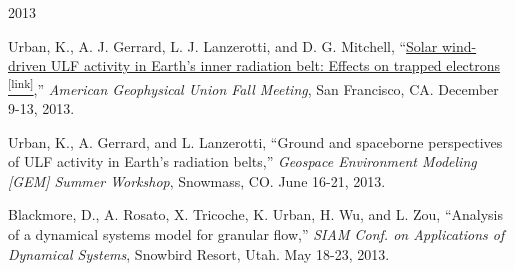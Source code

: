 \begin{center} \Large{2013} \end{center}
\normalsize
\begin{itemize*}
  \item
    Urban, K., A. J. Gerrard, L. J. Lanzerotti, and D. G. Mitchell,
    ``\href{http://adsabs.harvard.edu/abs/2013AGUFMSM33A2129U}{Solar
    wind-driven ULF activity in Earth’s inner radiation belt:
    Effects on trapped electrons \textsuperscript{\tiny{[link]}}},'' {\em American Geophysical Union Fall
    Meeting}, San Francisco, CA. December 9-13, 2013.

  \item Urban, K., A. Gerrard, and L. Lanzerotti, ``Ground and
    spaceborne perspectives of ULF activity in Earth's radiation
    belts,'' {\em Geospace Environment Modeling [GEM] Summer Workshop},
    Snowmass, CO. June 16-21, 2013.

  \item
    Blackmore, D., A. Rosato, X. Tricoche, K. Urban, H. Wu, and L. Zou,
    ``Analysis of a dynamical systems model for granular flow,''  {\em SIAM
    Conf. on Applications of Dynamical Systems}, Snowbird Resort, Utah.
    May 18-23, 2013.


\end{itemize*}


